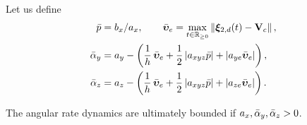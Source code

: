 \begin{lemma}
    \label{lemma:handpos_def_ultimate_boundedness}
    Let us define
    \begin{subequations}
        \begin{align}
            \Bar{p} &= b_x / a_x, \qquad
            \Bar{\bm{\upsilon}}_e = \max_{t \in \mathbb{R}_{\geq 0}}\left\|\bm{\xi}_{2, d}(t) - \mathbf{V}_c\right\|, \\
            \Bar{\alpha}_y &= a_y - \left(\frac{1}{h}\,\Bar{\bm{\upsilon}}_e + \frac{1}{2}\left|a_{xyz}\Bar{p}\right| + \left|a_{ye}\Bar{\bm{\upsilon}}_e\right|\right), \\
            \Bar{\alpha}_z &= a_z - \left(\frac{1}{h}\,\Bar{\bm{\upsilon}}_e + \frac{1}{2}\left|a_{xyz}\Bar{p}\right| + \left|a_{ze}\Bar{\bm{\upsilon}}_e\right|\right).
        \end{align} \label{eq:handpos_def_a_bounds}
    \end{subequations}

    \noindent The angular rate dynamics are ultimately bounded if $a_x, \Bar{\alpha}_y, \Bar{\alpha}_z > 0$.
\end{lemma}
